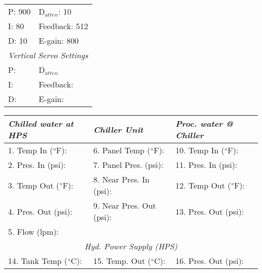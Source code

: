 \documentclass[letterpaper, 10pt]{article}
\begin{document}
\begin{table}[!ht]
        \footnotesize
        \renewcommand{\arraystretch}{1.1}
        \begin{tabular}{ p{1cm}|p{2cm} } \rowcolor[HTML]{EFEFEF}
            \multicolumn{2}{c}{\textit{Horizontal Servo Settings} \cellcolor[HTML]{EFEFEF}} \\ \hline P: 900 & D$_{atten}$: 10 \\ \hline
        I: 80 & Feedback: 512 \\ \hline 
        D: 10 & E-gain: 800 \\ \hline 
        \multicolumn{2}{c}{\textit{Vertical Servo Settings} \cellcolor[HTML]{EFEFEF}} \\ \hline 
        P:  & D$_{atten}$   \\ \hline 
        I:  & Feedback:  \\ \hline
        D:  & E-gain:  \\ \hline 
    \end{tabular} \hfill 
        \renewcommand{\arraystretch}{1.1}
        \begin{tabular}{ l|l|l } \rowcolor[HTML]{EFEFEF}
        \textit{Chilled water at HPS} & \textit{Chiller Unit} & \textit{Proc. water @ Chiller} \\ \hline 1. Temp In ($\degree$F):  & 6. Panel Temp ($\degree$F):  & 10. Temp In ($\degree$F):  \\ \hline 
    2. Pres. In (psi):  & 7. Panel Pres. (psi):  & 11. Pres. In (psi):  \\ \hline 
    3. Temp Out ($\degree$F):  & 8. Near Pres. In (psi): & 12. Temp Out ($\degree$F):  \\ \hline 
    4. Pres. Out (psi): & 9. Near Pres. Out (psi): & 13. Pres. Out (psi):  \\ \hline 
    5. Flow (lpm):  \\ \hline 
    \multicolumn{3}{c}{\textit{Hyd. Power Supply (HPS)} \cellcolor[HTML]{EFEFEF}} \\ \hline 
    14. Tank Temp ($\degree$C):  & 15. Temp. Out ($\degree$C):  & 16. Pres. Out (psi):  \\ \hline 
    \end{tabular} 
    \end{table} \vspace{-0.5cm} 
\end{document}
